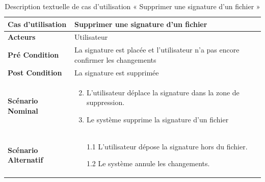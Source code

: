 \begin{longtable}{|p{5cm}|p{10cm}|}
  \caption{Description textuelle de cas d'utilisation « Supprimer une signature d'un fichier  »} \label{tab:description-textuelle-de-cas-d-utilisation-supprimer-une-signature-d-un-fichier} \\
\hline
\textbf{Cas d'utilisation}&Supprimer une signature d'un fichier \\
\hline
\textbf{Acteurs}&Utilisateur\\
\hline
\textbf{Pré Condition}&La signature est placée et l'utilisateur n'a pas encore confirmer les changements\\
\hline
\textbf{Post Condition}&La signature est supprimée\\
\hline
\textbf{Scénario Nominal}&
\vspace{-\baselineskip}
\begin{enumerate}
    \setcounter{enumi}{1}
    \item L'utilisateur déplace la signature dans la zone de suppression.
    \item Le système supprime la signature d'un fichier
\end{enumerate}\\
\hline
\textbf{Scénario Alternatif}&
\vspace{-\baselineskip}
\begin{enumerate}
    \item [1.1]L'utilisateur dépose la signature hors du fichier.
    \item [1.2]Le système annule les changements.
\end{enumerate}\\
\hline

\end{longtable}



